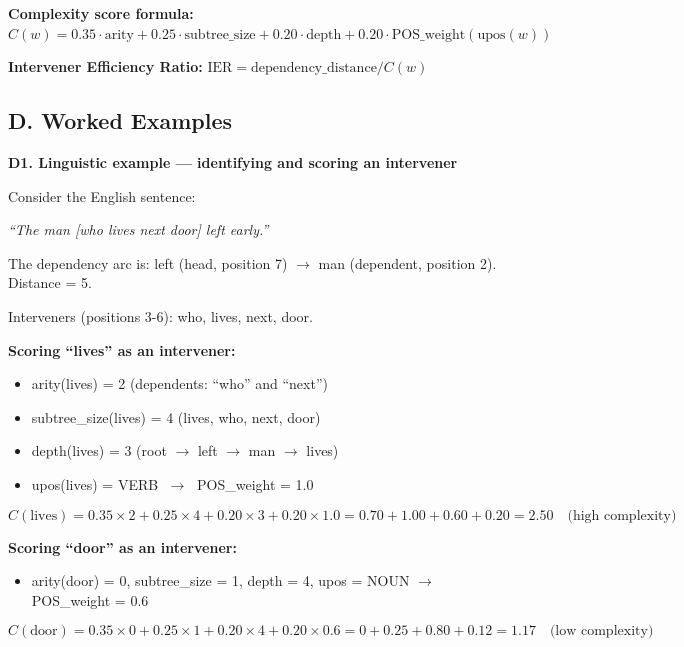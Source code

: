 \documentclass[11pt,a4paper]{article}
\begin{document}
\noindent\textbf{Complexity score formula:} $C(w) = 0.35{\cdot}\mathrm{arity} + 0.25{\cdot}\mathrm{subtree\_size} + 0.20{\cdot}\mathrm{depth} + 0.20{\cdot}\mathrm{POS\_weight}(\mathrm{upos}(w))$

\noindent\textbf{Intervener Efficiency Ratio:} $\mathrm{IER} = \mathrm{dependency\_distance} / C(w)$

\subsection*{D. Worked Examples}

\noindent\textbf{D1. Linguistic example --- identifying and scoring an intervener}

Consider the English sentence:
\begin{center}
\textit{``The man [who lives next door] left early.''}
\end{center}
The dependency arc is: left (head, position 7) $\rightarrow$ man (dependent, position 2). Distance = 5.

Interveners (positions 3-6): who, lives, next, door.

\textbf{Scoring ``lives'' as an intervener:}
\begin{itemize}[leftmargin=*, itemsep=1pt, parsep=0pt, topsep=2pt]
\item arity(lives) = 2  (dependents: ``who'' and ``next'')
\item subtree\_size(lives) = 4  (lives, who, next, door)
\item depth(lives) = 3  (root $\rightarrow$ left $\rightarrow$ man $\rightarrow$ lives)
\item upos(lives) = VERB $\;\rightarrow\;$ POS\_weight = 1.0
\end{itemize}
\[C(\text{lives}) = 0.35{\times}2 + 0.25{\times}4 + 0.20{\times}3 + 0.20{\times}1.0 = 0.70 + 1.00 + 0.60 + 0.20 = 2.50 \quad\text{(high complexity)}\]

\textbf{Scoring ``door'' as an intervener:}
\begin{itemize}[leftmargin=*, itemsep=1pt, parsep=0pt, topsep=2pt]
\item arity(door) = 0,\; subtree\_size = 1,\; depth = 4,\; upos = NOUN $\rightarrow$ POS\_weight = 0.6
\end{itemize}
\[C(\text{door}) = 0.35{\times}0 + 0.25{\times}1 + 0.20{\times}4 + 0.20{\times}0.6 = 0 + 0.25 + 0.80 + 0.12 = 1.17 \quad\text{(low complexity)}\]
\end{document}
